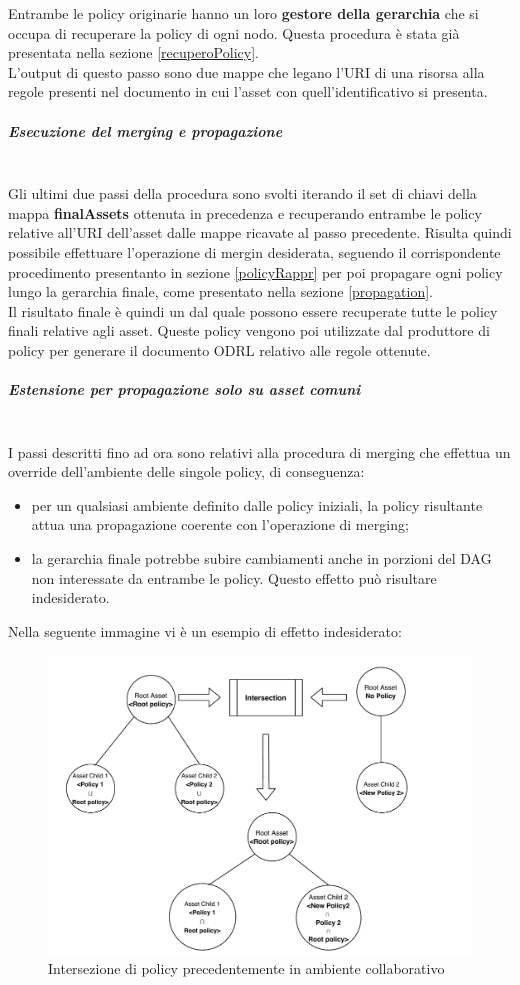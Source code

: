 \documentclass[12pt,a4paper,twoside]{book}
\begin{document}
Entrambe le policy originarie hanno un loro \textbf{gestore della gerarchia} che si occupa di recuperare la policy di ogni nodo. Questa procedura è stata già presentata nella sezione \ref{recuperoPolicy}.\\
L'output di questo passo sono due mappe che legano l'URI di una risorsa alla regole presenti nel documento in cui l'asset con quell'identificativo si presenta. 
\subparagraph{Esecuzione del merging e propagazione}\mbox{}\\
Gli ultimi due passi della procedura sono svolti iterando il set di chiavi della mappa \textbf{finalAssets} ottenuta in precedenza e recuperando entrambe le policy relative all'URI dell'asset dalle mappe ricavate al passo precedente. Risulta quindi possibile effettuare l'operazione di mergin desiderata, seguendo il corrispondente procedimento presentanto in sezione \ref{policyRappr} per poi propagare ogni policy lungo la gerarchia finale, come presentato nella sezione \ref{propagation}.\\
Il risultato finale è quindi un  dal quale possono essere recuperate tutte le policy finali relative agli asset. Queste policy vengono poi utilizzate dal produttore di policy per generare il documento ODRL relativo alle regole ottenute.
\subparagraph{Estensione per propagazione solo su asset comuni}\mbox{}\\ \label{estensioneAlg}
I passi descritti fino ad ora sono relativi alla procedura di merging che effettua un override dell'ambiente delle singole policy, di conseguenza:
\begin{itemize}
\item per un qualsiasi ambiente definito dalle policy iniziali, la policy risultante attua una propagazione coerente con l'operazione di merging;
\item la gerarchia finale potrebbe subire cambiamenti anche in porzioni del DAG non interessate da entrambe le policy. Questo effetto può risultare indesiderato.
\end{itemize}\newpage
Nella seguente immagine vi è un esempio di effetto indesiderato:
\begin{figure}[H]
\centering
\includegraphics[scale=.60]{../immagini/wrongProp.pdf}
\caption{Intersezione di policy precedentemente in ambiente collaborativo}
\label{wrongProp}
\end{figure}
\end{document}
